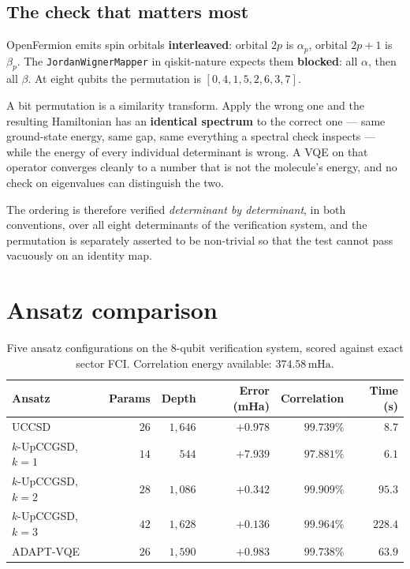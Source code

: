 \documentclass[11pt,a4paper]{article}
\newcommand{\mHa}{\ensuremath{\,\mathrm{mHa}}}
\newcommand{\code}[1]{\texttt{\small #1}}
\begin{document}
\subsection{The check that matters most}

OpenFermion emits spin orbitals \textbf{interleaved}: orbital $2p$ is
$\alpha_p$, orbital $2p+1$ is $\beta_p$. The \code{JordanWignerMapper} in
qiskit-nature expects them \textbf{blocked}: all $\alpha$, then all $\beta$. At
eight qubits the permutation is $[0,4,1,5,2,6,3,7]$.

\begin{unsupported}
A bit permutation is a similarity transform. Apply the wrong one and the
resulting Hamiltonian has an \textbf{identical spectrum} to the correct one ---
same ground-state energy, same gap, same everything a spectral check inspects
--- while the energy of every individual determinant is wrong. A VQE on that
operator converges cleanly to a number that is not the molecule's energy, and no
check on eigenvalues can distinguish the two.
\end{unsupported}

The ordering is therefore verified \emph{determinant by determinant}, in both
conventions, over all eight determinants of the verification system, and the
permutation is separately asserted to be non-trivial so that the test cannot
pass vacuously on an identity map.

\section{Ansatz comparison}

\begin{table}[htbp]
\centering
\caption{Five ansatz configurations on the 8-qubit verification system, scored
against exact sector FCI. Correlation energy available: $374.58\mHa$.}
\label{tab:ansatz}
\small
\begin{tabular}{lrrrrr}
\toprule
Ansatz & Params & Depth & Error (mHa) & Correlation & Time (s) \\
\midrule
UCCSD            & $26$ & $1{,}646$ & $+0.978$ & $99.739\%$ & $\mathbf{8.7}$ \\
$k$-UpCCGSD, $k{=}1$ & $14$ & $544$   & $+7.939$ & $97.881\%$ & $6.1$ \\
$k$-UpCCGSD, $k{=}2$ & $28$ & $1{,}086$ & $\mathbf{+0.342}$ & $99.909\%$ & $95.3$ \\
$k$-UpCCGSD, $k{=}3$ & $42$ & $1{,}628$ & $\mathbf{+0.136}$ & $99.964\%$ & $228.4$ \\
ADAPT-VQE        & $26$ & $1{,}590$ & $+0.983$ & $99.738\%$ & $63.9$ \\
\bottomrule
\end{tabular}
\end{table}
\end{document}
